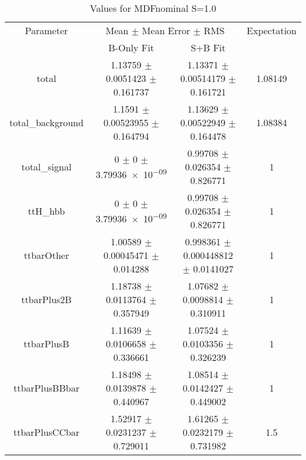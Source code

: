 \begin{table}
\centering
\caption{Values for MDFnominal S=1.0}
\begin{tabular}{cccc}
\toprule
Parameter & \multicolumn{2}{c}{Mean $\pm$ Mean Error $\pm$ RMS} & Expectation\\
 & B-Only Fit & S+B Fit & \\
\midrule
total & \num{1.13759} $\pm$ \num{0.0051423} $\pm$ \num{0.161737} & \num{1.13371} $\pm$ \num{0.00514179} $\pm$ \num{0.161721} & \num{1.08149}\\
total\_background & \num{1.1591} $\pm$ \num{0.00523955} $\pm$ \num{0.164794} & \num{1.13629} $\pm$ \num{0.00522949} $\pm$ \num{0.164478} & \num{1.08384}\\
total\_signal & \num{0} $\pm$ \num{0} $\pm$ \num{3.79936e-09} & \num{0.99708} $\pm$ \num{0.026354} $\pm$ \num{0.826771} & \num{1}\\
ttH\_hbb & \num{0} $\pm$ \num{0} $\pm$ \num{3.79936e-09} & \num{0.99708} $\pm$ \num{0.026354} $\pm$ \num{0.826771} & \num{1}\\
ttbarOther & \num{1.00589} $\pm$ \num{0.00045471} $\pm$ \num{0.014288} & \num{0.998361} $\pm$ \num{0.000448812} $\pm$ \num{0.0141027} & \num{1}\\
ttbarPlus2B & \num{1.18738} $\pm$ \num{0.0113764} $\pm$ \num{0.357949} & \num{1.07682} $\pm$ \num{0.0098814} $\pm$ \num{0.310911} & \num{1}\\
ttbarPlusB & \num{1.11639} $\pm$ \num{0.0106658} $\pm$ \num{0.336661} & \num{1.07524} $\pm$ \num{0.0103356} $\pm$ \num{0.326239} & \num{1}\\
ttbarPlusBBbar & \num{1.18498} $\pm$ \num{0.0139878} $\pm$ \num{0.440967} & \num{1.08514} $\pm$ \num{0.0142427} $\pm$ \num{0.449002} & \num{1}\\
ttbarPlusCCbar & \num{1.52917} $\pm$ \num{0.0231237} $\pm$ \num{0.729011} & \num{1.61265} $\pm$ \num{0.0232179} $\pm$ \num{0.731982} & \num{1.5}\\
\bottomrule
\end{tabular}
\end{table}